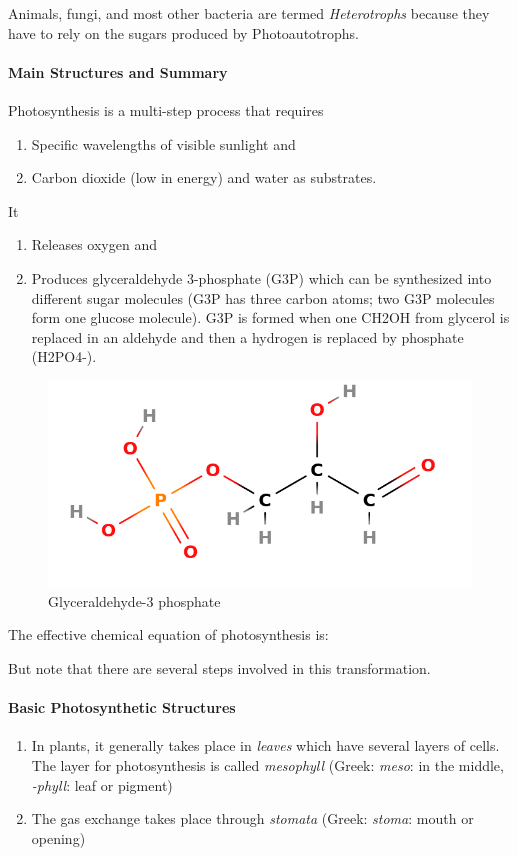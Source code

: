 Animals, fungi, and most other bacteria are termed \emph{Heterotrophs} because they have to rely on the sugars produced by Photoautotrophs.

\paragraph{Main Structures and Summary}
Photosynthesis is a multi-step process that requires
\begin{enumerate}
    \item Specific wavelengths of visible sunlight and
    \item Carbon dioxide (low in energy) and water as substrates.
\end{enumerate}
It 
\begin{enumerate}
    \item Releases oxygen and
    \item Produces glyceraldehyde 3-phosphate (G3P) which can be synthesized into different sugar molecules (G3P has three carbon atoms; two G3P molecules form one glucose molecule). G3P is formed when one CH2OH from glycerol is replaced in an aldehyde and then a hydrogen is replaced by phosphate (H2PO4-).
\end{enumerate}
\begin{figure}[ht!]
    \centering
    \includegraphics[width=0.8\linewidth]{g3p.png}
    \caption{Glyceraldehyde-3 phosphate}
    \label{fig: g3p}
\end{figure}

The effective chemical equation of photosynthesis is:


But note that there are several steps involved in this transformation.

\paragraph{Basic Photosynthetic Structures}
\begin{enumerate}
    \item In plants, it generally takes place in \emph{leaves} which have several layers of cells. The layer for photosynthesis is called \emph{mesophyll} (Greek: \emph{meso}: in the middle, \emph{-phyll}: leaf or pigment)
    \item The gas exchange takes place through \emph{stomata} (Greek: \emph{stoma}: mouth or opening)
\end{enumerate}


